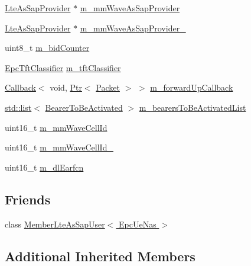 \begin{DoxyCompactItemize}
\item 
\hyperlink{classns3_1_1LteAsSapProvider}{Lte\+As\+Sap\+Provider} $\ast$ \hyperlink{classns3_1_1EpcUeNas_a3d486b3112753b9e0ade53e1d546e546}{m\+\_\+mm\+Wave\+As\+Sap\+Provider}
\item 
\hyperlink{classns3_1_1LteAsSapProvider}{Lte\+As\+Sap\+Provider} $\ast$ \hyperlink{classns3_1_1EpcUeNas_a7abf79dbedc37b67f8fae923e1a89604}{m\+\_\+mm\+Wave\+As\+Sap\+Provider\+\_}
\item 
uint8\+\_\+t \hyperlink{classns3_1_1EpcUeNas_a4555867556f2e4f4d6236d7d9c8df91c}{m\+\_\+bid\+Counter}
\item 
\hyperlink{classns3_1_1EpcTftClassifier}{Epc\+Tft\+Classifier} \hyperlink{classns3_1_1EpcUeNas_aad557b717272071b34807e2af0bd9364}{m\+\_\+tft\+Classifier}
\item 
\hyperlink{classns3_1_1Callback}{Callback}$<$ void, \hyperlink{classns3_1_1Ptr}{Ptr}$<$ \hyperlink{classns3_1_1Packet}{Packet} $>$ $>$ \hyperlink{classns3_1_1EpcUeNas_a389c1feab2167b9f7a0e81436ca0554b}{m\+\_\+forward\+Up\+Callback}
\item 
\hyperlink{openflow-interface_8h_afd9bcfa176617760671b67580f536fa7}{std\+::list}$<$ \hyperlink{structns3_1_1EpcUeNas_1_1BearerToBeActivated}{Bearer\+To\+Be\+Activated} $>$ \hyperlink{classns3_1_1EpcUeNas_ae0828a4050fc7be31deba30f7b69d94a}{m\+\_\+bearers\+To\+Be\+Activated\+List}
\item 
uint16\+\_\+t \hyperlink{classns3_1_1EpcUeNas_ae574d1d6cae34ecde7a1083b36b6d19b}{m\+\_\+mm\+Wave\+Cell\+Id}
\item 
uint16\+\_\+t \hyperlink{classns3_1_1EpcUeNas_a26d12e86dd0cb5f87d92d57b6012176c}{m\+\_\+mm\+Wave\+Cell\+Id\+\_}
\item 
uint16\+\_\+t \hyperlink{classns3_1_1EpcUeNas_a4c7c7d17d9ac2bc5481f367a218d7d33}{m\+\_\+dl\+Earfcn}
\end{DoxyCompactItemize}
\subsection*{Friends}
\begin{DoxyCompactItemize}
\item 
class \hyperlink{classns3_1_1EpcUeNas_a0575122d7a6179d3de7db0e3965a265f}{Member\+Lte\+As\+Sap\+User$<$ Epc\+Ue\+Nas $>$}
\end{DoxyCompactItemize}
\subsection*{Additional Inherited Members}


